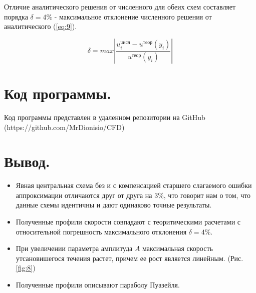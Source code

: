 Отличие аналитического решения от численного для обеих схем составляет порядка $\delta = 4\%$ - максимальное отклонение численного решения от аналитического (\ref{eq:9}).

\begin{equation}
    \delta = max\left| \frac{u_i^\text{числ}-u^\text{теор}(y_i)}{u^\text{теор}(y_i)}\right|
\label{eq:9}
\end{equation}

\section{Код программы.}
Код программы представлен в удаленном репозитории на GitHub \\ (https://github.com/MrDionisio/CFD)



\section{Вывод.}
\begin{itemize}
    \item Явная центральная схема без и с компенсацией старшего слагаемого ошибки аппроксимации отличаются друг от друга на 3\%, что говорит нам о том, что данные схемы идентичны и дают одинаково точные результаты.
    \item Полученные профили скорости совпадают с теоритическими расчетами с относительной погрешность максимального отклонения $\delta = 4\%$.
    \item При увеличении параметра амплитуда $A$ максимальная скорость утсановишегося течения растет, причем ее рост является линейным. (Рис. \ref{fig:8})
    \item Полученные профили описывают параболу Пуазейля.
    
\end{itemize}
